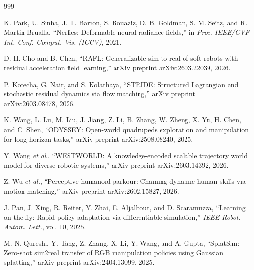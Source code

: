 \documentclass[11pt,a4paper]{article}
\begin{document}
\begin{thebibliography}{999}

K. Park, U. Sinha, J. T. Barron, S. Bouaziz, D. B. Goldman, S. M. Seitz, and R. Martin-Brualla, ``Nerfies: Deformable neural radiance fields,'' in \textit{Proc. IEEE/CVF Int. Conf. Comput. Vis. (ICCV)}, 2021.




D. H. Cho and B. Chen, ``{RAFL}: Generalizable sim-to-real of soft robots with residual acceleration field learning,'' arXiv preprint arXiv:2603.22039, 2026.




P. Kotecha, G. Nair, and S. Kolathaya, ``{STRIDE}: Structured Lagrangian and stochastic residual dynamics via flow matching,'' arXiv preprint arXiv:2603.08478, 2026.




K. Wang, L. Lu, M. Liu, J. Jiang, Z. Li, B. Zhang, W. Zheng, X. Yu, H. Chen, and C. Shen, ``{ODYSSEY}: Open-world quadrupeds exploration and manipulation for long-horizon tasks,'' arXiv preprint arXiv:2508.08240, 2025.




Y. Wang \textit{et al.}, ``{WESTWORLD}: A knowledge-encoded scalable trajectory world model for diverse robotic systems,'' arXiv preprint arXiv:2603.14392, 2026.




Z. Wu \textit{et al.}, ``Perceptive humanoid parkour: Chaining dynamic human skills via motion matching,'' arXiv preprint arXiv:2602.15827, 2026.




J. Pan, J. Xing, R. Reiter, Y. Zhai, E. Aljalbout, and D. Scaramuzza, ``Learning on the fly: Rapid policy adaptation via differentiable simulation,'' \textit{IEEE Robot. Autom. Lett.}, vol. 10, 2025.




M. N. Qureshi, Y. Tang, Z. Zhang, X. Li, Y. Wang, and A. Gupta, ``{SplatSim}: Zero-shot sim2real transfer of {RGB} manipulation policies using Gaussian splatting,'' arXiv preprint arXiv:2404.13099, 2025.




\end{thebibliography}
\end{document}
